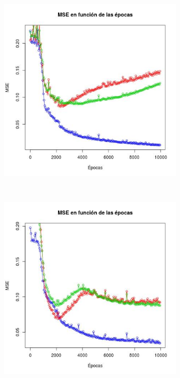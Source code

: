\documentclass[12pt, a4paper]{article}
\begin{document}
 \begin{figure}
    \centering

    \begin{subfigure}[b]{0.45\textwidth}
        \includegraphics[width=\textwidth]{mse3b}
    \end{subfigure}
      ~ %
    \begin{subfigure}[b]{0.45\textwidth}
        \includegraphics[width=\textwidth]{mse3c}

\end{subfigure}
\end{figure}
\end{document}
